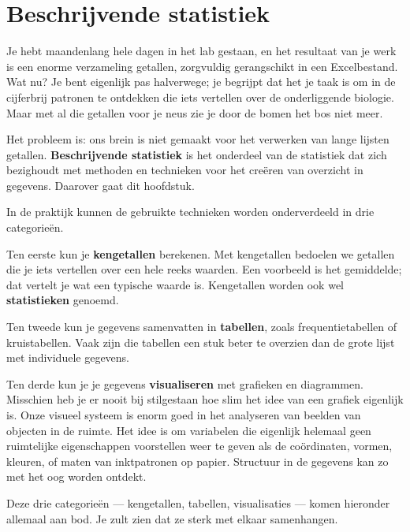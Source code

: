 \documentclass[
  a4paper,
]{scrbook}
\theoremstyle{definition}
\theoremstyle{definition}
\theoremstyle{remark}
\begin{document}
\providecommand{\se}[1]{\mathrm{SE}_{#1}}

\providecommand{\ct}[3]{t_{#1 (#2) #3}}

\providecommand{\HO}{H\ped{0}}
\providecommand{\HA}{H\ped{A}}
\providecommand{\df}{\mathrm{df}}

\section{Beschrijvende statistiek}\label{beschrijvende-statistiek}

Je hebt maandenlang hele dagen in het lab gestaan, en het resultaat van
je werk is een enorme verzameling getallen, zorgvuldig gerangschikt in
een Excelbestand. Wat nu? Je bent eigenlijk pas halverwege; je begrijpt
dat het je taak is om in de cijferbrij patronen te ontdekken die iets
vertellen over de onderliggende biologie. Maar met al die getallen voor
je neus zie je door de bomen het bos niet meer.

Het probleem is: ons brein is niet gemaakt voor het verwerken van lange
lijsten getallen. \textbf{Beschrijvende statistiek} is het onderdeel van
de statistiek dat zich bezighoudt met methoden en technieken voor het
creëren van overzicht in gegevens. Daarover gaat dit hoofdstuk.

In de praktijk kunnen de gebruikte technieken worden onderverdeeld in
drie categorieën.

Ten eerste kun je \textbf{kengetallen} berekenen. Met kengetallen
bedoelen we getallen die je iets vertellen over een hele reeks waarden.
Een voorbeeld is het gemiddelde; dat vertelt je wat een typische waarde
is. Kengetallen worden ook wel \textbf{statistieken} genoemd.

Ten tweede kun je gegevens samenvatten in \textbf{tabellen}, zoals
frequentietabellen of kruistabellen. Vaak zijn die tabellen een stuk
beter te overzien dan de grote lijst met individuele gegevens.

Ten derde kun je je gegevens \textbf{visualiseren} met grafieken en
diagrammen. Misschien heb je er nooit bij stilgestaan hoe slim het idee
van een grafiek eigenlijk is. Onze visueel systeem is enorm goed in het
analyseren van beelden van objecten in de ruimte. Het idee is om
variabelen die eigenlijk helemaal geen ruimtelijke eigenschappen
voorstellen weer te geven als de coördinaten, vormen, kleuren, of maten
van inktpatronen op papier. Structuur in de gegevens kan zo met het oog
worden ontdekt.

Deze drie categorieën --- kengetallen, tabellen, visualisaties --- komen
hieronder allemaal aan bod. Je zult zien dat ze sterk met elkaar
samenhangen.
\end{document}
